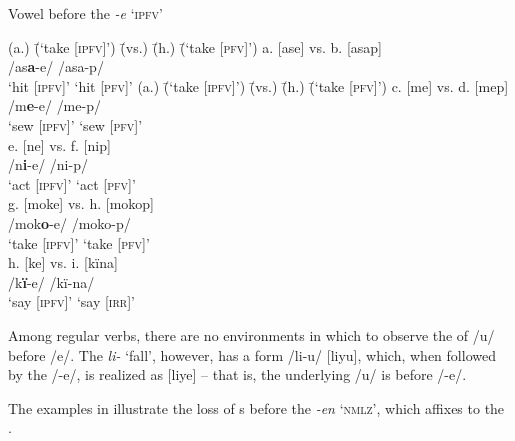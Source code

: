 \ea%
    \label{ex:phon:71}
          Vowel  before the   \textit{-e} ‘\textsc{ipfv}’\\
\begin{tabbing}    
{(a.)} \= {(‘take [\textsc{ipfv}]’)} \= {(vs.)} \= {(h.)} \= {(‘take [\textsc{pfv}]’)}\kill
{a.} \> {[ase]} \> {vs.} \> {b.} \> {[asap]}\\
{ } \> {/as\textbf{a}-e/} \> { } \> { } \> {/asa-p/}\\
{ } \> {‘hit [\textsc{ipfv}]’} \> { } \> { } \> {‘hit [\textsc{pfv}]’}   
{(a.)} \= {(‘take [\textsc{ipfv}]’)} \= {(vs.)} \= {(h.)} \= {(‘take [\textsc{pfv}]’)}\kill
{c.} \> {[me]} \> {vs.} \> {d.} \> {[mep]}\\
{ } \> {/m\textbf{e}-e/} \> { } \> { } \> {/me-p/}\\
{ } \> {‘sew [\textsc{ipfv}]’} \> { } \> { } \> {‘sew [\textsc{pfv}]’}\\
{e.} \> {[ne]} \> {vs.} \> {f.} \> {[nip]}\\
{ } \> {/n\textbf{i}-e/} \> { } \> { } \> {/ni-p/}\\
{ } \> {‘act [\textsc{ipfv}]’} \> { } \> { } \> {‘act [\textsc{pfv}]’}\\
{g.} \> {[moke]} \> {vs.} \> {h.} \> {[mokop]}\\
{ } \> {/mok\textbf{o}-e/} \> { } \> { } \> {/moko-p/}\\
{ } \> {‘take [\textsc{ipfv}]’} \> { } \> { } \> {‘take [\textsc{pfv}]’}\\
{h.} \> {[ke]} \> {vs.} \> {i.} \> {[kïna]}\\
{ } \> {/k\textbf{ï}-e/} \> { } \> { } \> {/kï-na/}\\
{ } \> {‘say [\textsc{ipfv}]’} \> { } \> { } \> {‘say [\textsc{irr}]’}\footnotemark
\end{tabbing}
\z
{}

Among regular verbs, there are no environments in which to observe the  of /u/ before /e/. The  \textit{li-} ‘fall’, however, has a  form /li-u/ [liyu], which, when followed by the   /-e/, is realized as [liye] -- that is, the underlying /u/ is  before /\nobreakdash-e/.

  The examples in  illustrate the loss of s before the   \textit{-en} ‘\textsc{nmlz}’, which affixes to the .

